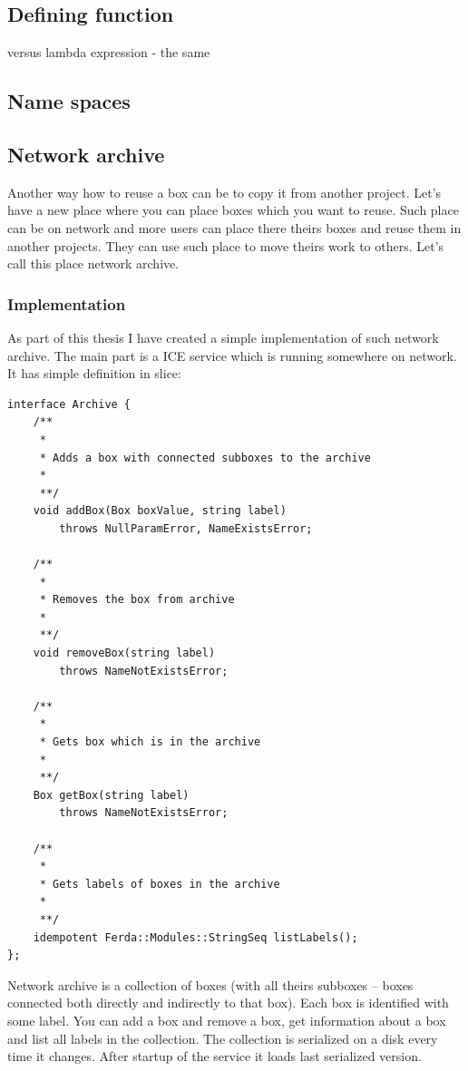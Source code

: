 \documentclass[a4paper,12pt]{book}
\begin{document}
\subsection{Defining function}
versus lambda expression - the same
\subsection{Name spaces}
\subsection{Network archive}
Another way how to reuse a box can be to copy it from another project. Let's have a new place where you can place boxes which you want to reuse. Such place can be on network and more users can place there theirs boxes and reuse them in another projects. They can use such place to move theirs work to others. Let's call this place network archive.

\subsubsection{Implementation}
As part of this thesis I have created a simple implementation of such network archive. The main part is a ICE service which is running somewhere on network. It has simple definition in slice:
\begin{verbatim}
interface Archive {
	/**
	 *
	 * Adds a box with connected subboxes to the archive
	 *
	 **/
	void addBox(Box boxValue, string label)
		throws NullParamError, NameExistsError;

	/**
	 *
	 * Removes the box from archive
	 *
	 **/
	void removeBox(string label)
		throws NameNotExistsError;

	/**
	 *
	 * Gets box which is in the archive
	 *
	 **/
	Box getBox(string label)
		throws NameNotExistsError;

	/**
	 *
	 * Gets labels of boxes in the archive
	 *
	 **/
	idempotent Ferda::Modules::StringSeq listLabels();
};
\end{verbatim}

Network archive is a collection of boxes (with all theirs subboxes -- boxes connected both directly and indirectly to that box). Each box is identified with some label. You can add a box and remove a box, get information about a box and list all labels in the collection. The collection is serialized on a disk every time it changes. After startup of the service it loads last serialized version.
\end{document}
